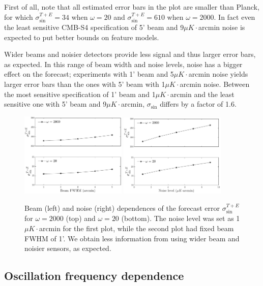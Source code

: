 First of all, note that all estimated error bars in the plot are smaller than Planck, for which $\sigma_{\sin}^{T+E}=34$ when $\omega=20$ and $\sigma_{\sin}^{T+E}=610$ when $\omega=2000$. In fact even the least sensitive CMB-S4 specification of 5' beam and 9$\mu K\cdot$arcmin noise is expected to put better bounds on feature models.

Wider beams and noisier detectors provide less signal and thus larger error bars, as expected. In this range of beam width and noise levels, noise has a bigger effect on the forecast; experiments with 1' beam and 5$\mu K\cdot$arcmin noise yields larger error bars than the ones with 5' beam with 1$\mu K\cdot$arcmin noise. Between the most sensitive specification of 1' beam and 1$\mu K\cdot$arcmin and the least sensitive one with 5' beam and 9$\mu K\cdot$arcmin, $\sigma_{\sin}$ differs by a factor of 1.6.


\begin{figure}[ht]
	\centering
	\includegraphics[width=0.45\textwidth]{beam_dependence.pdf}
	\includegraphics[width=0.45\textwidth]{noise_dependence.pdf}
	\caption{Beam (left) and noise (right) dependences of the forecast error $\sigma_{\sin}^{T+E}$ for $\omega=2000$ (top) and $\omega=20$ (bottom). The noise level was set as 1$\mu K \cdot$arcmin for the first plot, while the second plot had fixed beam FWHM of 1'. We obtain less information from using wider beam and noisier sensors, as expected.}
	\label{forecast beam and noise dependence}
\end{figure}

\subsection{Oscillation frequency dependence}

